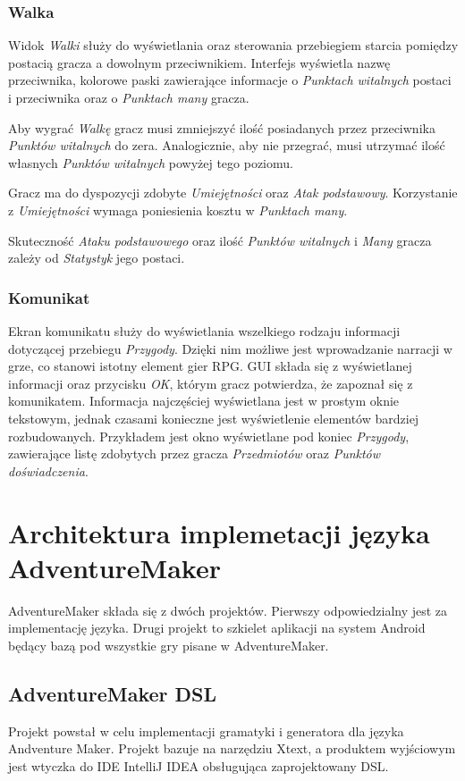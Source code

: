 \documentclass[openright]{xmgr}
\begin{document}
\subsection*{Walka}
Widok \textit{Walki} służy do wyświetlania oraz sterowania przebiegiem starcia pomiędzy postacią gracza a dowolnym przeciwnikiem. Interfejs wyświetla nazwę przeciwnika, kolorowe paski zawierające informacje o \textit{Punktach witalnych} postaci i przeciwnika oraz o \textit{Punktach many} gracza. 

Aby wygrać \textit{Walkę} gracz musi zmniejszyć ilość posiadanych przez przeciwnika \textit{Punktów witalnych} do zera. Analogicznie, aby nie przegrać, musi utrzymać ilość własnych \textit{Punktów witalnych}
powyżej tego poziomu.

Gracz ma do dyspozycji zdobyte \textit{Umiejętności} oraz \textit{Atak podstawowy}. Korzystanie z \textit{Umiejętności} wymaga poniesienia kosztu w \textit{Punktach many}.

Skuteczność \textit{Ataku podstawowego} oraz ilość \textit{Punktów witalnych} i \textit{Many} gracza zależy od \textit{Statystyk} jego postaci.

\subsection*{Komunikat}

Ekran komunikatu służy do wyświetlania wszelkiego rodzaju informacji dotyczącej przebiegu \textit{Przygody}. Dzięki nim możliwe jest wprowadzanie narracji w grze, co stanowi istotny element gier RPG. GUI składa się z wyświetlanej informacji oraz przycisku \textit{OK}, którym gracz potwierdza, że zapoznał się z komunikatem. Informacja najczęściej wyświetlana jest w prostym oknie tekstowym, jednak czasami konieczne jest wyświetlenie elementów bardziej rozbudowanych. Przykładem jest okno wyświetlane pod koniec \textit{Przygody}, zawierające listę zdobytych przez gracza \textit{Przedmiotów} oraz \textit{Punktów doświadczenia}.

\chapter{Architektura implemetacji języka AdventureMaker}

AdventureMaker składa się z dwóch projektów. Pierwszy odpowiedzialny jest za implementację języka. Drugi projekt to szkielet aplikacji na system Android będący bazą pod wszystkie gry pisane w AdventureMaker. 

\section{AdventureMaker DSL} 
Projekt powstał w celu implementacji gramatyki i generatora dla języka Andventure Maker. Projekt bazuje na narzędziu Xtext\cite{Xtext:2017:Doc}, a produktem wyjściowym jest wtyczka do IDE IntelliJ IDEA obsługująca zaprojektowany DSL. 
\end{document}
